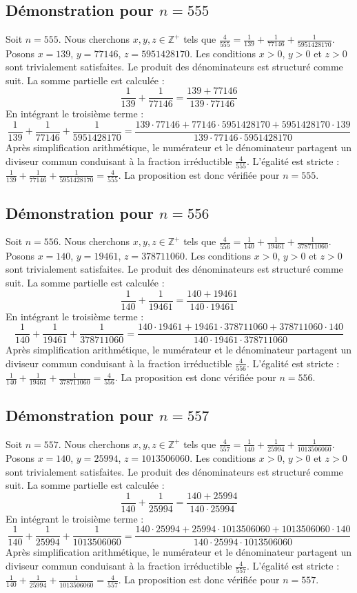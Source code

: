 \documentclass[11pt,a4paper]{article}
\begin{document}
\subsection{Démonstration pour $n = 555$}
Soit $n = 555$. Nous cherchons $x, y, z \in \mathbb{Z}^{+}$ tels que $\frac{4}{555} = \frac{1}{139} + \frac{1}{77146} + \frac{1}{5951428170}$.
Posons $x = 139$, $y = 77146$, $z = 5951428170$.
Les conditions $x > 0$, $y > 0$ et $z > 0$ sont trivialement satisfaites.
Le produit des dénominateurs est structuré comme suit. La somme partielle est calculée :
$$ \frac{1}{139} + \frac{1}{77146} = \frac{139+77146}{139 \cdot 77146} $$
En intégrant le troisième terme :
$$ \frac{1}{139} + \frac{1}{77146} + \frac{1}{5951428170} = \frac{139 \cdot 77146 + 77146 \cdot 5951428170 + 5951428170 \cdot 139}{139 \cdot 77146 \cdot 5951428170} $$
Après simplification arithmétique, le numérateur et le dénominateur partagent un diviseur commun conduisant à la fraction irréductible $\frac{4}{555}$.
L'égalité est stricte : $\frac{1}{139} + \frac{1}{77146} + \frac{1}{5951428170} = \frac{4}{555}$.
La proposition est donc vérifiée pour $n = 555$.
\subsection{Démonstration pour $n = 556$}
Soit $n = 556$. Nous cherchons $x, y, z \in \mathbb{Z}^{+}$ tels que $\frac{4}{556} = \frac{1}{140} + \frac{1}{19461} + \frac{1}{378711060}$.
Posons $x = 140$, $y = 19461$, $z = 378711060$.
Les conditions $x > 0$, $y > 0$ et $z > 0$ sont trivialement satisfaites.
Le produit des dénominateurs est structuré comme suit. La somme partielle est calculée :
$$ \frac{1}{140} + \frac{1}{19461} = \frac{140+19461}{140 \cdot 19461} $$
En intégrant le troisième terme :
$$ \frac{1}{140} + \frac{1}{19461} + \frac{1}{378711060} = \frac{140 \cdot 19461 + 19461 \cdot 378711060 + 378711060 \cdot 140}{140 \cdot 19461 \cdot 378711060} $$
Après simplification arithmétique, le numérateur et le dénominateur partagent un diviseur commun conduisant à la fraction irréductible $\frac{4}{556}$.
L'égalité est stricte : $\frac{1}{140} + \frac{1}{19461} + \frac{1}{378711060} = \frac{4}{556}$.
La proposition est donc vérifiée pour $n = 556$.
\subsection{Démonstration pour $n = 557$}
Soit $n = 557$. Nous cherchons $x, y, z \in \mathbb{Z}^{+}$ tels que $\frac{4}{557} = \frac{1}{140} + \frac{1}{25994} + \frac{1}{1013506060}$.
Posons $x = 140$, $y = 25994$, $z = 1013506060$.
Les conditions $x > 0$, $y > 0$ et $z > 0$ sont trivialement satisfaites.
Le produit des dénominateurs est structuré comme suit. La somme partielle est calculée :
$$ \frac{1}{140} + \frac{1}{25994} = \frac{140+25994}{140 \cdot 25994} $$
En intégrant le troisième terme :
$$ \frac{1}{140} + \frac{1}{25994} + \frac{1}{1013506060} = \frac{140 \cdot 25994 + 25994 \cdot 1013506060 + 1013506060 \cdot 140}{140 \cdot 25994 \cdot 1013506060} $$
Après simplification arithmétique, le numérateur et le dénominateur partagent un diviseur commun conduisant à la fraction irréductible $\frac{4}{557}$.
L'égalité est stricte : $\frac{1}{140} + \frac{1}{25994} + \frac{1}{1013506060} = \frac{4}{557}$.
La proposition est donc vérifiée pour $n = 557$.
\end{document}
